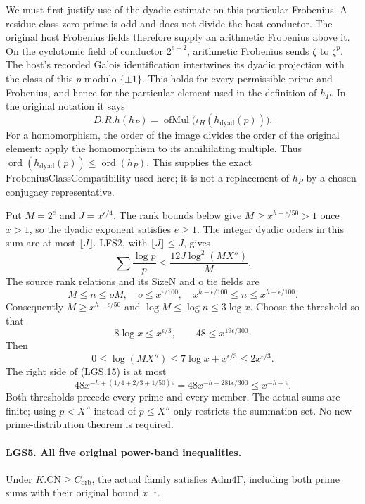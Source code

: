 We must first justify use of the dyadic estimate on this
particular Frobenius.  A residue-class-zero prime is odd and
does not divide the host conductor.  The original host
Frobenius fields therefore supply an arithmetic Frobenius
above it.  On the cyclotomic field of conductor \(2^{e+2}\),
arithmetic Frobenius sends \(\zeta\) to \(\zeta^p\).
The host's recorded Galois identification intertwines its
dyadic projection with the class of this \(p\) modulo
\(\{\pm1\}\).  This holds for every permissible prime and
Frobenius, and hence for the particular element used in the
definition of \(h_P\).  In the original notation it says
\[
 D.R.h(h_P)=
   \operatorname{ofMul}\!\bigl(\iota_H(h_{\mathrm{dyad}}(p))\bigr).
                                                               \tag{LGS.14}
\]
For a homomorphism, the order of the image divides the order
of the original element: apply the homomorphism to its
annihilating multiple.  Thus
\(\operatorname{ord}(h_{\mathrm{dyad}}(p))
 \le\operatorname{ord}(h_P)\).
This supplies the exact \(\mathrm{FrobeniusClassCompatibility}\)
used here; it is not a replacement of \(h_P\) by a chosen
conjugacy representative.

Put \(M=2^e\) and \(J=x^{\epsilon/4}\).
The rank bounds below give \(M\ge x^{h-\epsilon/50}>1\)
once \(x>1\), so the dyadic exponent satisfies \(e\ge1\).
The integer dyadic orders in this sum are at most
\(\lfloor J\rfloor\).  LFS2, with
\(\lfloor J\rfloor\le J\), gives
\[
 \sum\frac{\log p}{p}
       \le\frac{12J\log^2(MX'')}{M}.                  \tag{LGS.15}
\]
The source rank relations and its \(\mathrm{SizeN}\) and
\(\mathrm{o\_tie}\) fields are
\[
 M\le n\le oM,\quad o\le x^{\epsilon/100},\quad
 x^{h-\epsilon/100}\le n\le x^{h+\epsilon/100}.
 \]
Consequently \(M\ge x^{h-\epsilon/50}\) and
\(\log M\le\log n\le3\log x\).
Choose the threshold so that
\[
 8\log x\le x^{\epsilon/3},\qquad
                  48\le x^{19\epsilon/300}.
 \]
Then
\[
 0\le\log(MX'')\le
       7\log x+x^{\epsilon/3}\le2x^{\epsilon/3}.
 \]
The right side of (LGS.15) is at most
\[
 48x^{-h+(1/4+2/3+1/50)\epsilon}
 =48x^{-h+281\epsilon/300}
 \le x^{-h+\epsilon}.
 \]
Both thresholds precede every prime and every member.
The actual sums are finite; using \(p<X''\) instead of
\(p\le X''\) only restricts the summation set.
No new prime-distribution theorem is required.

\paragraph{LGS5. All five original power-band inequalities.}
\label{claim:LGS5}
Under \(K.\mathrm{CN}\ge C_{\mathrm{orb}}\), the actual family
satisfies \(\mathrm{Adm4F}\), including both prime sums with
their original bound \(x^{-1}\).


